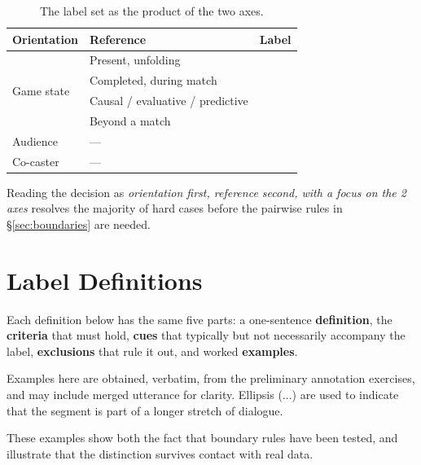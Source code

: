 \begin{table}[htbp]
\centering
\caption{The label set as the product of the two axes.}
\label{tab:axes}
\small
\renewcommand{\arraystretch}{1.3}
\begin{tabular}{@{}l l l@{}}
\toprule
\textbf{Orientation} & \textbf{Reference} & \textbf{Label} \\
\midrule
\multirow{4}{*}{Game state} & Present, unfolding      & \PBP{} \\
                            & Completed, during match   & \REC{} \\
                            & Causal / evaluative / predictive & \SA{} \\
                            & Beyond a match       & \STO{} \\
\midrule
Audience                    & ---                     & \HYP{} \\
Co-caster                   & ---                     & \BAN{} \\
\bottomrule
\end{tabular}
\end{table}

\noindent Reading the decision as \emph{orientation first, reference second, with a focus on the 2 axes} resolves the majority of hard cases before the pairwise rules in \S\ref{sec:boundaries} are needed.

\section{Label Definitions}
\label{sec:definitions}

Each definition below has the same five parts: a one-sentence
\textbf{definition}, the \textbf{criteria} that must hold, \textbf{cues}
that typically but not necessarily accompany the label, \textbf{exclusions}
that rule it out, and worked \textbf{examples}.

\begin{agrulebox}
Examples here are obtained, verbatim, from the preliminary annotation exercises, and may include merged utterance for clarity. Ellipsis (...) are used to indicate that the segment is part of a longer stretch of dialogue.

These examples show both the fact that boundary rules have been tested, and illustrate that the distinction survives contact with real data. 
\end{agrulebox}

